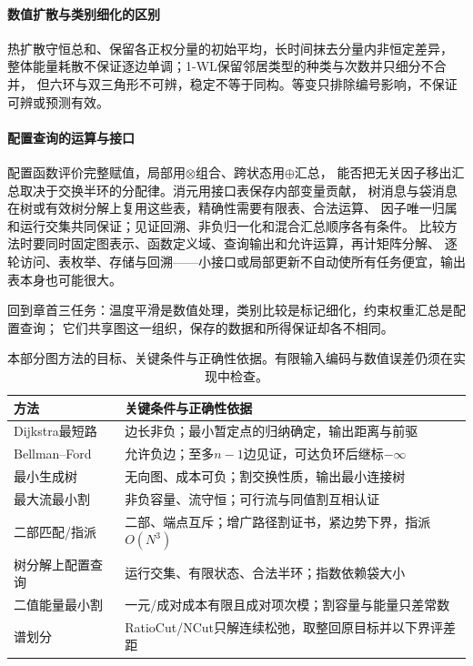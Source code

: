 \paragraph{数值扩散与类别细化的区别}
热扩散守恒总和、保留各正权分量的初始平均，长时间抹去分量内非恒定差异，
整体能量耗散不保证逐边单调；1-WL保留邻居类型的种类与次数并只细分不合并，
但六环与双三角形不可辨，稳定不等于同构。等变只排除编号影响，不保证可辨或预测有效。

\paragraph{配置查询的运算与接口}
配置函数评价完整赋值，局部用$\otimes$组合、跨状态用$\oplus$汇总，
能否把无关因子移出汇总取决于交换半环的分配律。消元用接口表保存内部变量贡献，
树消息与袋消息在树或有效树分解上复用这些表，精确性需要有限表、合法运算、
因子唯一归属和运行交集共同保证；见证回溯、非负归一化和混合汇总顺序各有条件。
比较方法时要同时固定图表示、函数定义域、查询输出和允许运算，再计矩阵分解、
逐轮访问、表枚举、存储与回溯——小接口或局部更新不自动使所有任务便宜，输出表本身也可能很大。

回到章首三任务：温度平滑是数值处理，类别比较是标记细化，约束权重汇总是配置查询；
它们共享图这一组织，保存的数据和所得保证却各不相同。

\begin{table}[htbp]
  \centering\small
  \caption{本部分图方法的目标、关键条件与正确性依据。有限输入编码与数值误差仍须在实现中检查。}
  \label{tab:graph-algorithm-conditions}
  \begin{tabularx}{\linewidth}{@{}lX@{}}
    \toprule
    方法 & 关键条件与正确性依据\\
    \midrule
    Dijkstra最短路 & 边长非负；最小暂定点的归纳确定，输出距离与前驱\\
    Bellman--Ford & 允许负边；至多$n-1$边见证，可达负环后继标$-\infty$\\
    最小生成树 & 无向图、成本可负；割交换性质，输出最小连接树\\
    最大流最小割 & 非负容量、流守恒；可行流与同值割互相认证\\
    二部匹配/指派 & 二部、端点互斥；增广路径割证书，紧边势下界，指派$O(N^3)$\\
    树分解上配置查询 & 运行交集、有限状态、合法半环；指数依赖袋大小\\
    二值能量最小割 & 一元/成对成本有限且成对项次模；割容量与能量只差常数\\
    谱划分 & RatioCut/NCut只解连续松弛，取整回原目标并以下界评差距\\
    \bottomrule
  \end{tabularx}
\end{table}
